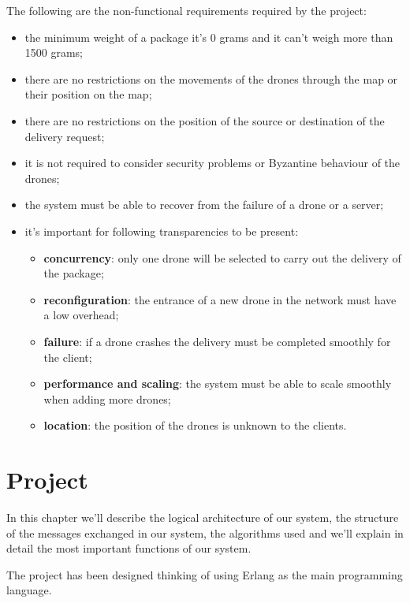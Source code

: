 \documentclass[a4paper, oneside]{memoir}
\begin{document}
The following are the non-functional requirements required by the project:
\begin{itemize}
\item the minimum weight of a package it's 0 grams and it can't weigh more than 1500 grams;
\item there are no restrictions on the movements of the drones through the map or their position on the map;
\item there are no restrictions on the position of the source or destination of the delivery request;
\item it is not required to consider security problems or Byzantine behaviour of the drones;
\item the system must be able to recover from the failure of a drone or a server;
\item it's important for following transparencies to be present:
	\begin{itemize}
	\item \textbf{concurrency}: only one drone will be selected to carry out the delivery of the package;
	\item \textbf{reconfiguration}: the entrance of a new drone in the network must have a low overhead;
	\item \textbf{failure}: if a drone crashes the delivery must be completed smoothly for the client;
	\item \textbf{performance and scaling}: the system must be able to scale smoothly when adding more drones;
	\item \textbf{location}: the position of the drones is unknown to the clients.
	\end{itemize}
\end{itemize}


\chapter{Project}
In this chapter we'll describe the logical architecture of our system, the structure of the messages exchanged in our system, the algorithms used and we'll explain in detail the most important functions of our system.

The project has been designed thinking of using Erlang as the main programming language.
\end{document}
